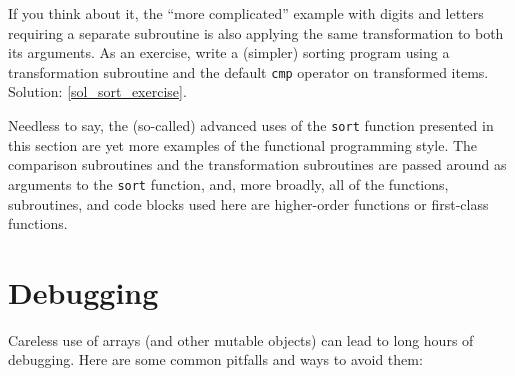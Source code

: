 If you think about it, the ``more complicated'' example 
with digits and letters requiring a separate subroutine 
is also applying the same transformation to both its 
arguments. As an exercise, write a (simpler) sorting 
program using a transformation subroutine and the default 
{\tt cmp} operator on transformed items. Solution: \ref{sol_sort_exercise}.
\label{sort_exercise}

Needless to say, the (so-called) advanced uses of the 
{\tt sort} function presented in this section are yet 
more examples of the functional programming style. The 
comparison subroutines and the transformation subroutines 
are passed around as arguments to the {\tt sort} 
function, and, more broadly, all of the functions, 
subroutines, and code blocks used here are higher-order 
functions or first-class functions.

\section{Debugging}

Careless use of arrays (and other mutable objects)
can lead to long hours of debugging.  Here are some common
pitfalls and ways to avoid them:

